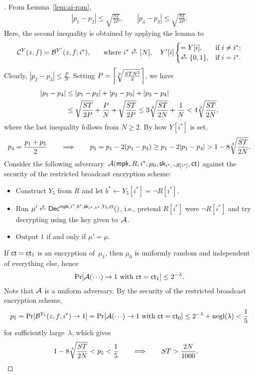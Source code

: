 \begin{proof}[]
From Lemma~\ref{lem:ai-rom},
\begin{align*}
|p_1-p_2|\leq\sqrt{\frac{ST}{2P}},\qquad
|p_4-p_3|\leq\sqrt{\frac{ST}{2P}}.
\end{align*}
Here, the second inequality is obtained by applying the lemma to
\begin{align*}
\scriptC^Y(z,f)=\scriptB^{Y'}(z,f;i^\ast)\textup{,\qquad where }
i^\ast\draws[N],\quad
Y'[i]\begin{cases}
=Y[i],&\textup{if }i\neq i^\ast;\\
\draws\bit,&\textup{if }i=i^\ast.
\end{cases}
\end{align*}
Clearly, ${|p_2-p_3|\leq\frac{P}{N}}$.
Setting ${P=\left\lceil\sqrt[3]{\frac{STN^2}{2}}\right\rceil}$, we have
\begin{align*}
|p_1-p_4|
&{}\leq
|p_1-p_2|+|p_2-p_3|+|p_3-p_4|
\\&{}\leq
\sqrt{\frac{ST}{2P}}+\frac{P}{N}+\sqrt{\frac{ST}{2P}}
\leq
3\sqrt[3]{\frac{ST}{2N}}+\frac1N
<
4\sqrt[3]{\frac{ST}{2N}},
\end{align*}
where the last inequality follows from ${N\geq 2}$.
By how $Y[i^\ast]$ is set,
\begin{align*}
p_4=\frac{p_1+p_5}{2}
\WideNarrow{}{\!\!}
\qquad\Longrightarrow\qquad
\WideNarrow{}{\!\!}
p_5
=p_1-2(p_1-p_4)
\geq p_1-2|p_1-p_4|
>1-8\cbrt{\frac{ST}{2N}}.
\end{align*}
Consider the following adversary~$\scriptA(\mpk,R,i^\ast,\mu_0,\sk_{i^\ast,\neg R[i^\ast]},\ct)$ against the security of the restricted broadcast encryption scheme:
\begin{itemize}
\item Construct $Y_5$ from $R$ and
let ${b^\ast\gets Y_5[i^\ast]=\neg R[i^\ast]}$.
\item Run ${\mu'\draws\Dec^{\mpk,i^\ast,b^\ast,\sk_{i^\ast,b^\ast},Y_5,\ct}()}$,
i.e., pretend $R[i^\ast]$ were $\neg R[i^\ast]$ and try decrypting using the key given to~${\mathcal{A}}$.
\item Output $1$ if and only if ${\mu'=\mu}$.
\end{itemize}
If ${\ct=\ct_1}$ is an encryption of~$\mu_1$, then $\mu_0$ is uniformly random and independent of everything else, hence
\begin{align*}
\Pr[\scriptA({\cdots})\to 1\textup{ with }\ct=\ct_1]\leq 2^{-\lambda}.
\end{align*}
Note that ${\mathcal{A}}$ is a uniform adversary.
By the security of the restricted broadcast encryption scheme,
\begin{align*}
p_5
=\Pr[\scriptB^{Y_5}(z,f;i^\ast)\to 1]
=\Pr[\scriptA({\cdots})\to 1\textup{ with }\ct=\ct_0]
\leq 2^{-\lambda}+\negl(\lambda)
<\frac15
\end{align*}
for sufficiently large~$\lambda$, which gives
\begin{align*}
1-8\sqrt[3]{\frac{ST}{2N}}<p_5<\frac15
&
\qquad\Longrightarrow\qquad
ST>\frac{2N}{1000}.
\qedhere
\end{align*}
\end{proof}
